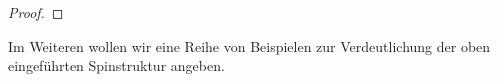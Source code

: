 \begin{Kor}
\begin{proof}
%		
	\end{proof}
\end{Kor}

Im Weiteren wollen wir eine Reihe von Beispielen zur Verdeutlichung der oben eingeführten Spinstruktur angeben.

